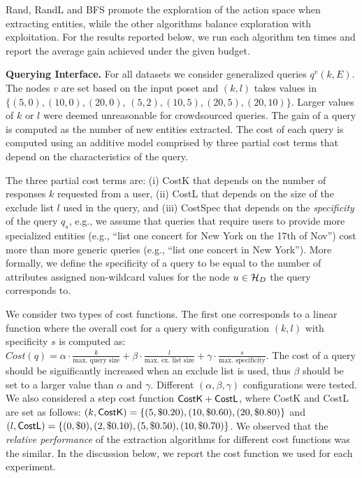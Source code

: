 Rand, RandL and BFS promote the exploration of the action space when extracting entities, while the other algorithms balance exploration with exploitation. For the results reported below, we run each algorithm ten times and report the average gain achieved under the given budget.

\vspace{5pt}\noindent\textbf{Querying Interface.} For all datasets we consider generalized queries $q^v(k,E)$. The nodes $v$ are set based on the input poset and $(k,l)$ takes values in {\small $\{(5,0), (10,0), (20,0)$, $(5,2), (10,5), (20,5), (20,10)\}$}. Larger values of $k$ or $l$ were deemed unreasonable for crowdsourced queries. The gain of a query is computed as the number of new entities extracted. The cost of each query is computed using an additive model comprised by three partial cost terms that depend on the characteristics of the query. 

The three partial cost terms are: (i) {\sf CostK} that depends on the number of responses $k$ requested from a user, (ii) {\sf CostL} that depends on the size of the exclude list $l$ used in the query, and (iii) {\sf CostSpec} that depends on the {\em specificity} of the query $q_s$, e.g., we assume that queries that require users to provide more specialized entities (e.g., ``list one concert for New York on the 17th of Nov'') cost more than more generic queries (e.g.,  ``list one concert in New York''). More formally, we define the specificity of a query to be equal to the number of attributes assigned non-wildcard values for the node $u \in \mathcal{H}_D$ the query corresponds to. 

We consider two types of cost functions. The first one corresponds to a linear function where the overall cost for a query with configuration $(k,l)$ with specificity $s$ is computed as:{\scriptsize $Cost(q) = \alpha \cdot \frac{k}{\mbox{max. query size}} + \beta \cdot  \frac{l}{\mbox{max. ex. list size}} + \gamma \cdot  \frac{s}{\mbox{max. specificity}} $}. The cost of a query should be significantly increased when an exclude list is used, thus $\beta$ should be set to a larger value than $\alpha$ and $\gamma$. Different $(\alpha, \beta, \gamma)$ configurations were tested. We also considered a step cost function ${\sf CostK} + {\sf CostL}$, where {\sf CostK} and {\sf CostL} are set as follows: $(k,{\sf CostK}) = \{(5,\$0.20), (10,\$0.60), (20,\$0.80)\}$ and $(l,{\sf CostL}) = \{(0,\$0), (2,\$0.10), (5,\$0.50), (10,\$0.70)\}$. We observed that the {\em relative performance} of the extraction algorithms for different cost functions was the similar. In the discussion below, we report the cost function we used for each experiment. 

